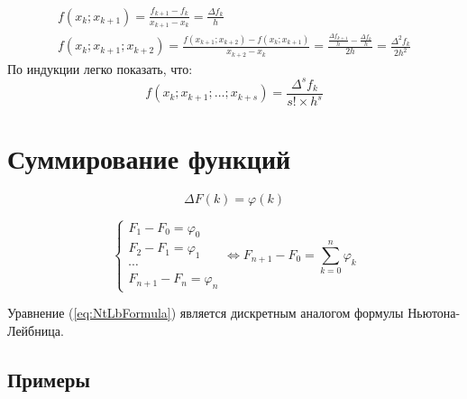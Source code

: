 \documentclass[a4paper,11pt]{article}
\begin{document}
  \begin{gather*}
    f(x_k; x_{k+1}) = \frac{f_{k+1} - f_k}{x_{k+1} - x_k} = \frac{\Delta f_k}{h} \\
    f(x_k; x_{k+1}; x_{k+2}) = \frac{f(x_{k+1}; x_{k+2}) - f(x_k; x_{k+1})}{x_{k+2} - x_k}
        = \frac{\frac{\Delta f_{k+1}}{h} - \frac{\Delta f_k}{h}}{2h} = \frac{\Delta^2 f_k}{2h^2}
  \end{gather*}
  По индукции легко показать, что: \\
  \[f(x_k; x_{k+1}; \dots; x_{k+s}) = \frac{\Delta^s f_k}{s! \times h^s}\]
\newpage

\section{Суммирование функций}
\begin{equation}
  \Delta F(k) = \varphi(k)
\end{equation}

\begin{equation}
  \begin{cases}
    F_1 - F_0 = \varphi_0 \\
    F_2 - F_1 = \varphi_1 \\
    \cdots \\
    F_{n+1} - F_n = \varphi_n
  \end{cases} \Leftrightarrow F_{n+1} - F_0 = \sum_{k=0}^{n} \varphi_k
  \label{eq:NtLbFormula}
\end{equation}

Уравнение (\ref{eq:NtLbFormula}) является дискретным аналогом формулы Ньютона-Лейбница.

  \subsection{Примеры}
\end{document}
